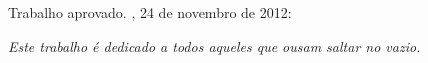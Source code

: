 \documentclass[
	12pt,				%
	openright,			%
	twoside,			%
	a4paper,			%
	english,			%
	french,				%
	spanish,			%
	brazil				%
	]{senai-cimatec-abntex2}
\begin{document}
%
% 
%
\begin{folhadeaprovacao}

	\begin{center}
		{\ABNTEXchapterfont\large\imprimirautor}

		\vspace*{\fill}\vspace*{\fill}
		\begin{center}
			\ABNTEXchapterfont\bfseries\Large\imprimirtitulo
		\end{center}
		\vspace*{\fill}

		\hspace{.45\textwidth}
		\begin{minipage}{.5\textwidth}
			\imprimirpreambulo
		\end{minipage}%
		\vspace*{\fill}
	\end{center}

	Trabalho aprovado. \imprimirlocal, 24 de novembro de 2012:


	\begin{center}
		\vspace*{0.5cm}
		{\large\imprimirlocal}
		\par
		{\large\imprimirdata}
		\vspace*{1cm}
	\end{center}

\end{folhadeaprovacao}
\begin{dedicatoria}
	\vspace*{\fill}
	\centering
	\noindent
	\textit{ Este trabalho é dedicado a todos aqueles que ousam saltar no vazio.} \vspace*{\fill}
\end{dedicatoria}
\end{document}
